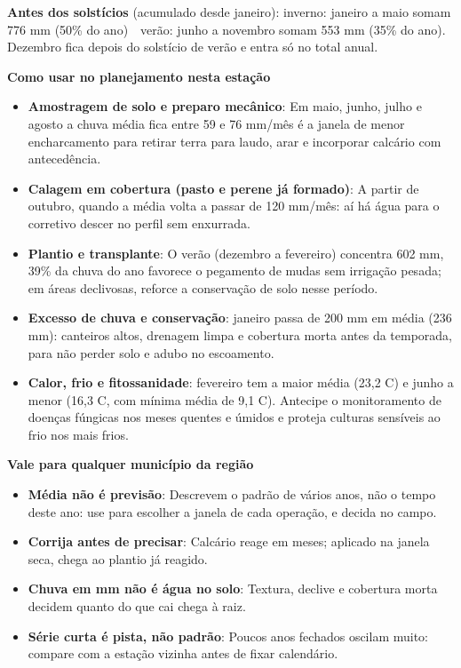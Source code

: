 \documentclass[10pt,a4paper]{article}
\begin{document}
\vspace{1pt}
{\footnotesize\textbf{Antes dos solstícios} (acumulado desde janeiro):
inverno: janeiro a maio somam 776 mm (50\% do ano) \,\textbullet\, verão: junho a novembro somam 553 mm (35\% do ano). Dezembro fica depois do solstício de verão e entra só no total
anual.}

\vspace{2pt}
{\bfseries\small Como usar no planejamento nesta estação}

\footnotesize\begin{itemize}\setlength{\itemsep}{0.5pt}
  \item \textbf{Amostragem de solo e preparo mecânico}: Em maio, junho, julho e agosto a chuva média fica entre 59 e 76 mm/mês \textemdash{} é a janela de menor encharcamento para retirar terra para laudo, arar e incorporar calcário com antecedência.
  \item \textbf{Calagem em cobertura (pasto e perene já formado)}: A partir de outubro, quando a média volta a passar de 120 mm/mês: aí há água para o corretivo descer no perfil sem enxurrada.
  \item \textbf{Plantio e transplante}: O verão (dezembro a fevereiro) concentra 602 mm, 39\% da chuva do ano \textemdash{} favorece o pegamento de mudas sem irrigação pesada; em áreas declivosas, reforce a conservação de solo nesse período.
  \item \textbf{Excesso de chuva e conservação}: janeiro passa de 200 mm em média (236 mm): canteiros altos, drenagem limpa e cobertura morta antes da temporada, para não perder solo e adubo no escoamento.
  \item \textbf{Calor, frio e fitossanidade}: fevereiro tem a maior média (23,2 \textdegree{}C) e junho a menor (16,3 \textdegree{}C, com mínima média de 9,1 \textdegree{}C). Antecipe o monitoramento de doenças fúngicas nos meses quentes e úmidos e proteja culturas sensíveis ao frio nos mais frios.
\end{itemize}

\vspace{1pt}
{\bfseries\small Vale para qualquer município da região}

\scriptsize\begin{itemize}\setlength{\itemsep}{0.5pt}
  \item \textbf{Média não é previsão}: Descrevem o padrão de vários anos, não o tempo deste ano: use para escolher a janela de cada operação, e decida no campo.
  \item \textbf{Corrija antes de precisar}: Calcário reage em meses; aplicado na janela seca, chega ao plantio já reagido.
  \item \textbf{Chuva em mm não é água no solo}: Textura, declive e cobertura morta decidem quanto do que cai chega à raiz.
  \item \textbf{Série curta é pista, não padrão}: Poucos anos fechados oscilam muito: compare com a estação vizinha antes de fixar calendário.
\end{itemize}
\end{document}
